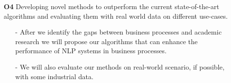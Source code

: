 \begin{itemize}
    \item[\textbf{O4}] Developing novel methods to outperform the current state-of-the-art algorithms and evaluating them with real world data on different use-cases.
    \begin{itemize}
        \item[-] After we identify the gaps between business processes and academic research we will propose our algorithms that can enhance the performance of NLP systems in business processes.
        \item[-] We will also evaluate our methods on real-world scenario, if possible, with some industrial data.
    \end{itemize}
    
\end{itemize}


    
    
